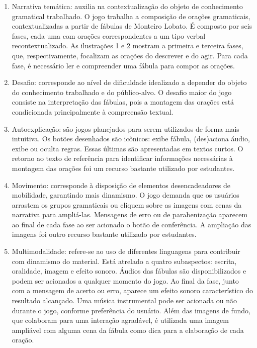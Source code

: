 \begin{enumerate}
\item Narrativa temática: auxilia na contextualização do objeto de
conhecimento gramatical trabalhado. O jogo trabalha a composição de
orações gramaticais, contextualizadas a partir de fábulas de Monteiro
Lobato. É composto por seis fases, cada uma com orações correspondentes
a um tipo verbal recontextualizado. As ilustrações 1 e 2 mostram a
primeira e terceira fases, que, respectivamente, focalizam as orações do
descrever e do agir. Para cada fase, é necessário ler e compreender uma
fábula para compor as orações.

\item Desafio: corresponde ao nível de dificuldade idealizado a depender
do objeto do conhecimento trabalhado e do público-alvo. O desafio maior
do jogo consiste na interpretação das fábulas, pois a montagem das
orações está condicionada principalmente à compreensão textual.

\item Autoexplicação: são jogos planejados para serem utilizados de forma
mais intuitiva. Os botões desenhados são icônicos: exibe fábula,
(des)aciona áudio, exibe ou oculta regras. Essas últimas são
apresentadas em textos curtos. O retorno ao texto de referência para
identificar informações necessárias à montagem das orações foi um
recurso bastante utilizado por estudantes.

\item Movimento: corresponde à disposição de elementos desencadeadores de
mobilidade, garantindo mais dinamismo. O jogo demanda que os usuários
arrastem os grupos gramaticais ou cliquem sobre as imagens com cenas da
narrativa para ampliá-las. Mensagens de erro ou de parabenização
aparecem ao final de cada fase ao ser acionado o botão de conferência. A
ampliação das imagens foi outro recurso bastante utilizado por
estudantes.

\item Multimodalidade: refere-se ao uso de diferentes linguagens para
contribuir com dinamismo do material. Está atrelado a quatro
subaspectos: escrita, oralidade, imagem e efeito sonoro. Áudios das
fábulas são disponibilizados e podem ser acionados a qualquer momento do
jogo. Ao final da fase, junto com a mensagem de acerto ou erro, aparece
um efeito sonoro característico do resultado alcançado. Uma música
instrumental pode ser acionada ou não durante o jogo, conforme
preferência do usuário. Além das imagens de fundo, que colaboram para
uma interação agradável, é utilizada uma imagem ampliável com alguma
cena da fábula como dica para a elaboração de cada oração.
\end{enumerate}


